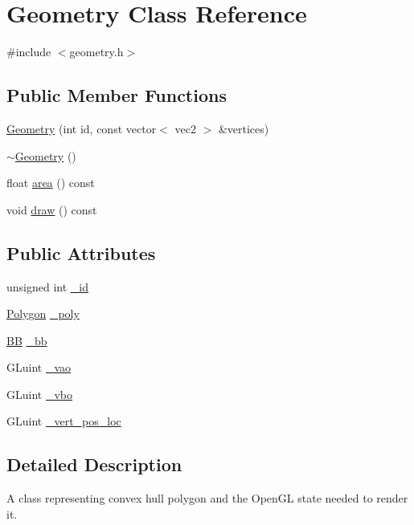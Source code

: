 \hypertarget{class_geometry}{\section{Geometry Class Reference}
\label{class_geometry}
}


{\ttfamily \#include $<$geometry.\+h$>$}

\subsection*{Public Member Functions}
\begin{DoxyCompactItemize}
\item 
\hyperlink{class_geometry_ab3fa632888073f5576dbec2f5c8649e3}{Geometry} (int id, const vector$<$ vec2 $>$ \&vertices)
\item 
\hyperlink{class_geometry_ad55e832122ab3a2833dcaa6507867678}{$\sim$\+Geometry} ()
\item 
float \hyperlink{class_geometry_a097e52cc8d17366119366e01c0df526c}{area} () const 
\item 
void \hyperlink{class_geometry_aeabdd331b6654e60cd3502b334719531}{draw} () const 
\end{DoxyCompactItemize}
\subsection*{Public Attributes}
\begin{DoxyCompactItemize}
\item 
unsigned int \hyperlink{class_geometry_afdd3cb26908cc8cd257caeb1af9376ef}{\+\_\+id}
\item 
\hyperlink{class_polygon}{Polygon} \hyperlink{class_geometry_a60904c40acf7a23b3fd28435278019c7}{\+\_\+poly}
\item 
\hyperlink{class_b_b}{B\+B} \hyperlink{class_geometry_a242426057d9d19b7c9a68a31eb0584d3}{\+\_\+bb}
\item 
G\+Luint \hyperlink{class_geometry_ae8c3a8b756c681aa95bf7e0998f0a37d}{\+\_\+vao}
\item 
G\+Luint \hyperlink{class_geometry_a66c15fff8a8a614e5f9734974354fd2e}{\+\_\+vbo}
\item 
G\+Luint \hyperlink{class_geometry_a547d84fcd9258557891da46d19985544}{\+\_\+vert\+\_\+pos\+\_\+loc}
\end{DoxyCompactItemize}


\subsection{Detailed Description}
A class representing convex hull polygon and the Open\+G\+L state needed to render it. 

